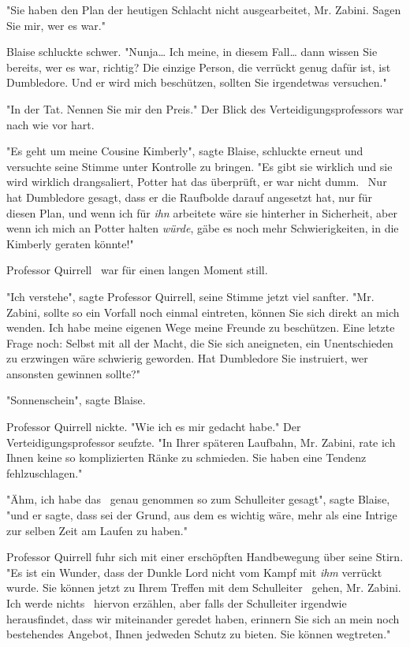 {"Sie haben den Plan der heutigen Schlacht nicht ausgearbeitet, Mr. Zabini. Sagen Sie mir, wer es war."

Blaise schluckte schwer. "Nunja… Ich meine, in diesem Fall… dann wissen Sie bereits, wer es war, richtig? Die einzige Person, die verrückt genug dafür ist, ist Dumbledore. Und er wird mich beschützen, sollten Sie irgendetwas versuchen."

"In der Tat. Nennen Sie mir den Preis." Der Blick des Verteidigungsprofessors war nach wie vor hart.

"Es geht um meine Cousine Kimberly", sagte Blaise, schluckte erneut und versuchte seine Stimme unter Kontrolle zu bringen. "Es gibt sie wirklich und sie wird wirklich drangsaliert, Potter hat das überprüft, er war nicht dumm. ~Nur hat Dumbledore gesagt, dass er die Raufbolde darauf angesetzt hat, nur für diesen Plan, und wenn ich für \emph{ihn} arbeitete wäre sie hinterher in Sicherheit, aber wenn ich mich an Potter halten \emph{würde}, gäbe es noch mehr Schwierigkeiten, in die Kimberly geraten könnte!"

Professor Quirrell ~war für einen langen Moment still.

"Ich verstehe", sagte Professor Quirrell, seine Stimme jetzt viel sanfter. "Mr. Zabini, sollte so ein Vorfall noch einmal eintreten, können Sie sich direkt an mich wenden. Ich habe meine eigenen Wege meine Freunde zu beschützen. Eine letzte Frage noch: Selbst mit all der Macht, die Sie sich aneigneten, ein Unentschieden zu erzwingen wäre schwierig geworden. Hat Dumbledore Sie instruiert, wer ansonsten gewinnen sollte?"

"Sonnenschein", sagte Blaise.

Professor Quirrell nickte. "Wie ich es mir gedacht habe." Der Verteidigungsprofessor seufzte. "In Ihrer späteren Laufbahn, Mr. Zabini, rate ich Ihnen keine so komplizierten Ränke zu schmieden. Sie haben eine Tendenz fehlzuschlagen."

"Ähm, ich habe das ~genau genommen so zum Schulleiter gesagt", sagte Blaise, "und er sagte, dass sei der Grund, aus dem es wichtig wäre, mehr als eine Intrige zur selben Zeit am Laufen zu haben."

Professor Quirrell fuhr sich mit einer erschöpften Handbewegung über seine Stirn. "Es ist ein Wunder, dass der Dunkle Lord nicht vom Kampf mit \emph{ihm} verrückt wurde. Sie können jetzt zu Ihrem Treffen mit dem Schulleiter ~gehen, Mr. Zabini. Ich werde nichts ~hiervon erzählen, aber falls der Schulleiter irgendwie herausfindet, dass wir miteinander geredet haben, erinnern Sie sich an mein noch bestehendes Angebot, Ihnen jedweden Schutz zu bieten. Sie können wegtreten."

}
